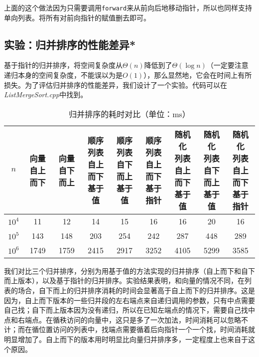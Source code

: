 上面的这个做法因为只需要调用\lstinline{forward}来从前向后地移动指针，所以也同样支持单向列表。将所有对前向指针的赋值删去即可。

\subsection{实验：归并排序的性能差异*}

基于指针的归并排序，将空间复杂度从$\Theta(n)$降低到了$\Theta(\log n)$（一定要注意递归本身的空间复杂度，不能误以为是$O(1)$），那么显然地，它会在时间上有所损失。为了评估归并排序的性能差异，我们设计了一个实验。代码可以在\textit{ListMergeSort.cpp}中找到。

\begin{table}
  \centering
  \caption{归并排序的耗时对比（单位：ms）}
  \begin{tabular}{c|cccccccc}
    \toprule
  $n$ & \thead{向量\\自上而下} & \thead{向量\\自下而上} & \thead{顺序\\列表\\自上而下\\基于值} & \thead{顺序\\列表\\自下而上\\基于值} & \thead{顺序\\列表\\自上而下\\基于指针} & \thead{随机化\\列表\\自上而下\\基于值} & \thead{随机化\\列表\\自下而上\\基于值} & \thead{随机化\\列表\\自上而下\\基于指针}  
      \\
    \midrule
  $10^4$ &  11 & 12 & 14 & 15 & 16 & 16 & 20 & 16 \\
  $10^5$ &  143 & 148 & 203 & 254 & 242 & 287 & 448 & 289 \\
  $10^6$ &  1749 & 1759 & 2415 & 2917 & 3252 & 4105 & 5299 & 3585 \\
    \bottomrule
  \end{tabular}
  \label{tab:lis4}
\end{table}


我们对比三个归并排序，分别为用基于值的方法实现的归并排序（自上而下和自下而上版本），以及基于指针的归并排序。实验结果表明，和向量的情况不同，在列表的场合，自下而上的归并排序消耗的时间会显著高于自上而下的归并排序。这是因为，自上而下版本的一些归并段的左右端点来自递归调用的参数，只有中点需要自己找；自下而上版本因为没有递归，所以在已知左端点的情况下，需要自己找中点和右端点。在循秩访问的向量中，这只是多了一次加法，时间消耗可以忽略不计；而在循位置访问的列表中，找端点需要循着后向指针一个一个找，时间消耗就明显增加了。自上而下的版本用时明显比向量归并排序多，一定程度上也来自于这个原因。


